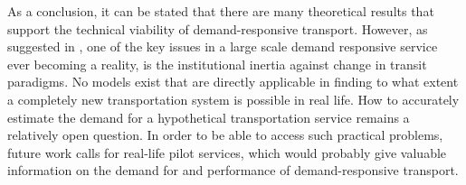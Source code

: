 \documentclass[dissertation,draft*]{aaltoseries}
\begin{document}
% 

As a conclusion, it can be stated that there are many theoretical results
that support the technical viability of demand-responsive transport.
However, as suggested in \cite{cortes}, one of the key issues in a large scale demand 
responsive service ever becoming a reality, is the
institutional inertia against change in transit paradigms. No models exist that are
directly applicable in finding to what extent a completely new transportation system is possible in real life.
How to accurately estimate the demand for a hypothetical transportation service remains a relatively open question.
In order to be able to access such practical problems, future work calls for 
real-life pilot services, which would probably give valuable information on the 
demand for and performance of demand-responsive transport.
\end{document}
